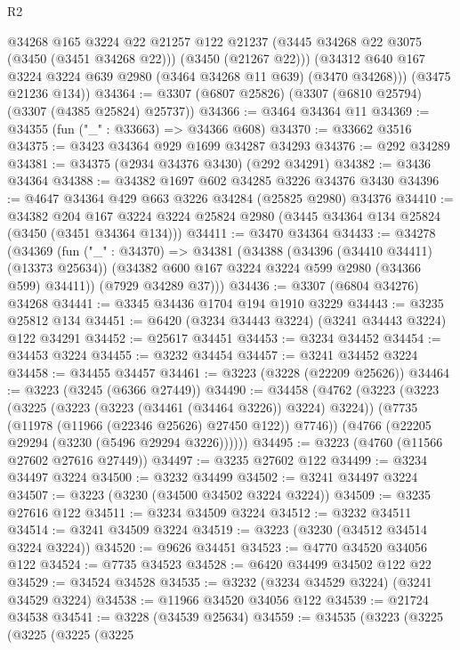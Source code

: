 \begin{lexlean}{R2}
\begin{coremodule}
          @34268
          @165
          @3224
          @22
          @21257
          @122
          @21237
          (@3445 @34268 @22 @3075 (@3450 (@3451 @34268 @22)))
          (@3450 (@21267 @22)))
        (@34312 @640 @167 @3224 @3224 @639 @2980 (@3464 @34268 @11 @639) (@3470 @34268)))
      (@3475 @21236 @134))
@34364 := @3307 (@6807 @25826) (@3307 (@6810 @25794) (@3307 (@4385 @25824) @25737))
@34366 := @3464 @34364 @11
@34369 := @34355 (fun ("_" : @33663) => @34366 @608)
@34370 := @33662 @3516
@34375 := @3423 @34364 @929 @1699 @34287 @34293
@34376 := @292 @34289
@34381 := @34375 (@2934 @34376 @3430) (@292 @34291)
@34382 := @3436 @34364
@34388 := @34382 @1697 @602 @34285 @3226 @34376 @3430
@34396 := @4647 @34364 @429 @663 @3226 @34284 (@25825 @2980) @34376
@34410 := @34382
    @204
    @167
    @3224
    @3224
    @25824
    @2980
    (@3445 @34364 @134 @25824 (@3450 (@3451 @34364 @134)))
@34411 := @3470 @34364
@34433 := @34278
    (@34369
      (fun ("_" : @34370) =>
      @34381
        (@34388
          (@34396 (@34410 @34411) (@13373 @25634))
          (@34382 @600 @167 @3224 @3224 @599 @2980 (@34366 @599) @34411))
        (@7929 @34289 @37)))
@34436 := @3307 (@6804 @34276) @34268
@34441 := @3345 @34436 @1704 @194 @1910 @3229
@34443 := @3235 @25812 @134
@34451 := @6420 (@3234 @34443 @3224) (@3241 @34443 @3224) @122 @34291
@34452 := @25617 @34451
@34453 := @3234 @34452
@34454 := @34453 @3224
@34455 := @3232 @34454
@34457 := @3241 @34452 @3224
@34458 := @34455 @34457
@34461 := @3223 (@3228 (@22209 @25626))
@34464 := @3223 (@3245 (@6366 @27449))
@34490 := @34458
    (@4762
      (@3223
        (@3223
          (@3225 (@3223 (@3223 (@34461 (@34464 @3226)) @3224) @3224))
          (@7735 (@11978 (@11966 (@22346 @25626) @27450 @122)) @7746))
        (@4766 (@22205 @29294 (@3230 (@5496 @29294 @3226))))))
@34495 := @3223 (@4760 (@11566 @27602 @27616 @27449))
@34497 := @3235 @27602 @122
@34499 := @3234 @34497 @3224
@34500 := @3232 @34499
@34502 := @3241 @34497 @3224
@34507 := @3223 (@3230 (@34500 @34502 @3224 @3224))
@34509 := @3235 @27616 @122
@34511 := @3234 @34509 @3224
@34512 := @3232 @34511
@34514 := @3241 @34509 @3224
@34519 := @3223 (@3230 (@34512 @34514 @3224 @3224))
@34520 := @9626 @34451
@34523 := @4770 @34520 @34056 @122
@34524 := @7735 @34523
@34528 := @6420 @34499 @34502 @122 @22
@34529 := @34524 @34528
@34535 := @3232 (@3234 @34529 @3224) (@3241 @34529 @3224)
@34538 := @11966 @34520 @34056 @122
@34539 := @21724 @34538
@34541 := @3228 (@34539 @25634)
@34559 := @34535
    (@3223
      (@3225
        (@3225
          (@3225
            (@3225

\end{coremodule}
\end{lexlean}
